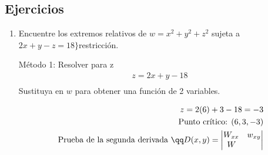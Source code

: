 \subsection{Ejercicios}
\begin{enumerate}
    \item Encuentre los extremos relativos de $\displaystyle w=x^2+y^2+z^2$ sujeta a $\displaystyle 2x+y-z=18 \}$restricción. 
        \begin{center}
            Método 1: Resolver para z
           \begin{align*}
               z = 2x+y-18 \\
           \end{align*}
           Sustituya en $\displaystyle w$  para obtener una función de 2 variables.

           \begin{align*}
               z = 2(6)+3-18=-3 \\ 
               \text{ Punto crítico: } (6,3,-3) \\ 
               \text{ Prueba de la segunda derivada } \qq D(x,y) = \begin{vmatrix}
                   W_{xx} & w_{xy}  \\ 
                   W_{} 
               \end{vmatrix}
           \end{align*}
           

\end{center}
\end{enumerate}
